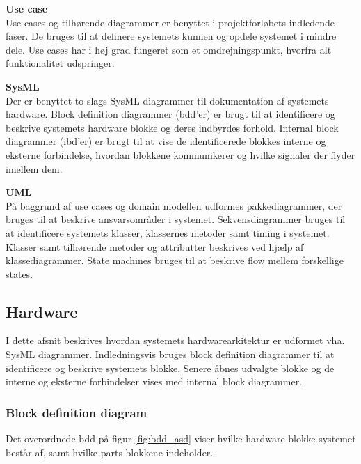 \textbf{Use case}\\
Use cases og tilhørende diagrammer er benyttet i projektforløbets indledende faser. De bruges til at definere systemets kunnen og opdele systemet i mindre dele. Use cases har i høj grad fungeret som et omdrejningspunkt, hvorfra alt funktionalitet udspringer.


\textbf{SysML}\\
Der er benyttet to slags SysML diagrammer til dokumentation af systemets hardware. Block definition diagrammer (bdd'er) er brugt til at identificere og beskrive systemets hardware blokke og deres indbyrdes forhold. Internal block diagrammer (ibd'er) er brugt til at vise de identificerede blokkes interne og eksterne forbindelse, hvordan blokkene kommunikerer og hvilke signaler der flyder imellem dem.


\textbf{UML}\\
På baggrund af use cases og domain modellen udformes pakkediagrammer, der bruges til at beskrive ansvarsområder i systemet. Sekvensdiagrammer bruges til at identificere systemets klasser, klassernes metoder samt timing i systemet. Klasser samt tilhørende metoder og attributter beskrives ved hjælp af klassediagrammer. State machines bruges til at beskrive flow mellem forskellige states. 


\newpage

\subsection{Hardware}
I dette afsnit beskrives hvordan systemets hardwarearkitektur er udformet vha. SysML diagrammer. Indledningsvis bruges block definition diagrammer til at identificere og beskrive systemets blokke. Senere åbnes udvalgte blokke og de interne og eksterne forbindelser vises med internal block diagrammer. 


\subsubsection*{Block definition diagram}

Det overordnede bdd på figur \ref{fig:bdd_asd} viser hvilke hardware blokke systemet består af, samt hvilke parts blokkene indeholder.

